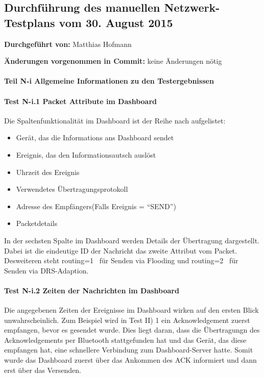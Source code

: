 \subsection{Durchführung des manuellen Netzwerk-Testplans vom 30. August 2015}

\textbf{Durchgeführt von:} Matthias Hofmann

\textbf{Änderungen vorgenommen in Commit:} keine Änderungen nötig

\paragraph{Teil N-i Allgemeine Informationen zu den Testergebnissen}

\paragraph{Test N-i.1 Packet Attribute im Dashboard}

Die Spaltenfunktionalität im Dashboard ist der Reihe nach aufgelistet:

\begin{itemize}
  \item Gerät, das die Informations ans Dashboard sendet
  \item Ereignis, das den Informationsautsch auslöst
  \item Uhrzeit des Ereignis
  \item Verwendetes Übertragungsprotokoll
  \item Adresse des Empfängers(Falls Ereignis = ``SEND'')
  \item Packetdetails
\end{itemize}

In der sechsten Spalte im Dashboard werden Details der Übertragung dargestellt. Dabei ist die eindeutige ID der Nachricht das zweite Attribut vom Packet. Desweiteren steht \glqq routing=1\grqq~ für Senden via Flooding und \glqq routing=2\grqq~ für Senden via DRS-Adaption.

\paragraph{Test N-i.2 Zeiten der Nachrichten im Dashboard}

Die angegebenen Zeiten der Ereignisse im Dashboard wirken auf den ersten Blick unwahrscheinlich. Zum Beispiel wird in Test II) 1 ein Acknowledgement zuerst empfangen, bevor es gesendet wurde. Dies liegt daran, dass die Übertragungn des Acknowledgements per Bluetooth stattgefunden hat und das Gerät, das diese empfangen hat, eine schnellere Verbindung zum Dashboard-Server hatte. Somit wurde das Dashboard zuerst über das Ankommen des ACK informiert und dann erst über das Versenden.

